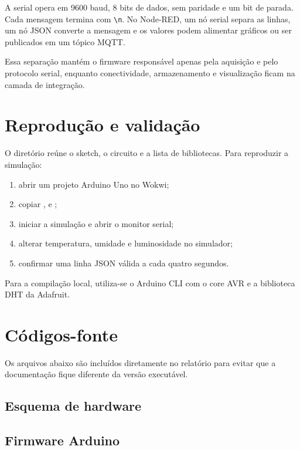 \documentclass[12pt,a4paper]{article}
\begin{document}
A serial opera em 9600 baud, 8 bits de dados, sem paridade e um bit de parada.
Cada mensagem termina com \texttt{\textbackslash n}. No Node-RED, um nó serial
separa as linhas, um nó JSON converte a mensagem e os valores podem alimentar
gráficos ou ser publicados em um tópico MQTT.

Essa separação mantém o firmware responsável apenas pela aquisição e pelo
protocolo serial, enquanto conectividade, armazenamento e visualização ficam
na camada de integração.

\section{Reprodução e validação}

O diretório  reúne o sketch, o circuito e a
lista de bibliotecas. Para reproduzir a simulação:

\begin{enumerate}
  \item abrir um projeto Arduino Uno no Wokwi;
  \item copiar ,  e
        ;
  \item iniciar a simulação e abrir o monitor serial;
  \item alterar temperatura, umidade e luminosidade no simulador;
  \item confirmar uma linha JSON válida a cada quatro segundos.
\end{enumerate}

Para a compilação local, utiliza-se o Arduino CLI com o core AVR e a biblioteca
DHT da Adafruit.

\newpage
\section{Códigos-fonte}
\label{sec:fontes}

Os arquivos abaixo são incluídos diretamente no relatório para evitar que a
documentação fique diferente da versão executável.

\subsection{Esquema de hardware}



\subsection{Firmware Arduino}


\end{document}
